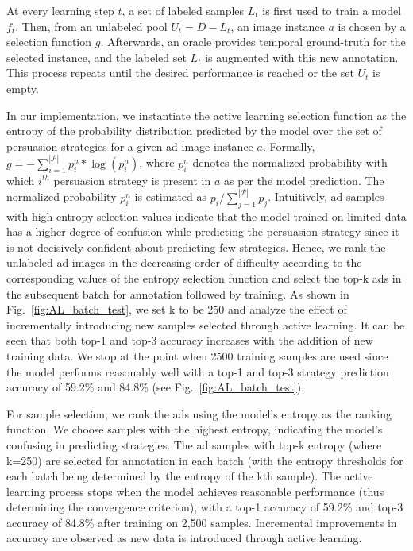At every learning step $t$, a set of labeled samples $L_t$ is first used to train a model
$f_t$. Then, from an unlabeled pool $U_t=D-L_t$, an image instance $a$ is chosen by a selection function $g$. Afterwards, an oracle provides temporal ground-truth for the selected instance, and the labeled set $L_t$ is augmented with this new annotation. This process repeats until the desired performance is reached or the set $U_t$ is empty.

In our implementation, we instantiate the active learning selection function as the entropy of the probability distribution predicted by the model over the set of persuasion strategies for a given ad image instance $a$. Formally, $g = -\sum_{i=1}^{|\mathcal{P}|}p^{n}_{i}*\log(p^{n}_i)$, where $p^{n}_i$ denotes the normalized probability with which $i^{th}$ persuasion strategy is present in $a$ as per the model prediction. The normalized probability $p^{n}_{i}$ is estimated as $p_i/\sum_{j=1}^{|\mathcal{P}|}p_j$. Intuitively, ad samples with high entropy selection values indicate that the model trained on limited data has a higher degree of confusion while predicting the persuasion strategy since it is not decisively confident about predicting few strategies. Hence, we rank the unlabeled ad images in the decreasing order of difficulty according to the corresponding values of the entropy selection function and select the top-k ads in the subsequent batch for annotation followed by training. As shown in Fig.~\ref{fig:AL_batch_test}, we set k to be 250 and analyze the effect of incrementally introducing new samples selected through active learning. It can be seen that both top-1 and top-3 accuracy increases with the addition of new training data. We stop at the point when 2500 training samples are used since the model performs reasonably well with a top-1 and top-3 strategy prediction accuracy of 59.2\% and 84.8\% (see Fig.~\ref{fig:AL_batch_test}). 


For sample selection, we rank the ads using the model's entropy as the ranking function. We choose samples with the highest entropy, indicating the model's confusing in predicting strategies. The ad samples with top-k entropy (where k=250) are selected for annotation in each batch (with the entropy thresholds for each batch being determined by the entropy of the kth sample). The active learning process stops when the model achieves reasonable performance (thus determining the convergence criterion), with a top-1 accuracy of 59.2\% and top-3 accuracy of 84.8\% after training on 2,500 samples. Incremental improvements in accuracy are observed as new data is introduced through active learning.





